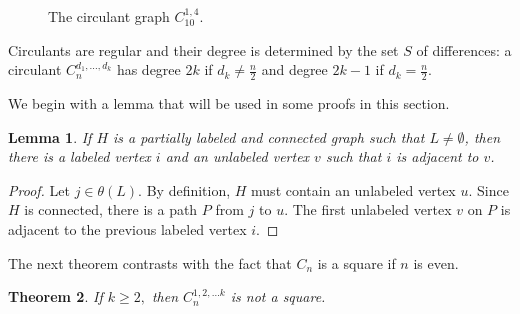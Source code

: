 \documentclass{article}
\newtheorem{theorem}{Theorem}[section]
\newtheorem{lemma}[theorem]{Lemma}
\theoremstyle{definition}
\begin{document}
\begin{figure}[ht] 
\centering
{}

\caption{The circulant graph $C_{10}^{1,4}$.}
\label{fig:circulant}
\end{figure}


Circulants are regular and their degree is determined by the set $S$ of differences: a circulant $C_n^{d_1, \dotsc, d_k}$ has degree $2k$ if $d_k \neq \frac{n}{2}$ and degree $2k-1$ if $d_k = \frac{n}{2}$.

We begin with a lemma that will be used in some proofs in this section.

\begin{lemma} \label{lemma:connect} 
 If $H$ is a partially labeled and connected graph such that $L\neq\emptyset$,  then there is a labeled vertex $i$ and an unlabeled vertex $v$ such that $i$ is adjacent to $v$. 
\end{lemma}

\begin{proof}
Let $j\in \theta(L)$. By definition, $H$ must contain an unlabeled vertex $u$. Since $H$ is connected, there is a path $P$ from $j$ to $u$. The first unlabeled vertex $v$ on $P$ is adjacent to the previous labeled vertex $i$.
 \end{proof}



The next theorem contrasts with the fact that $C_n$ is a square if $n$ is even. 

\begin{theorem}
If $k\geq 2,$ then $C_{n}^{1,2, \ldots k}$ is not a square. 
\end{theorem}
\end{document}
